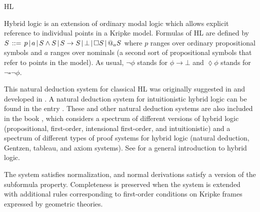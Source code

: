 \begin{entry}{HL}
\begin{clarifications}
Hybrid logic is an extension of ordinary modal logic which allows explicit reference to individual points in a Kripke model. Formulas of HL are defined by 
$S \hspace{.5mm} ::= \hspace{.5mm} p \hspace{.5mm} | \hspace{.5mm} a
\hspace{.5mm} | \hspace{.5mm} S \wedge S \hspace{.5mm} | \hspace{.5mm}
S \rightarrow S \hspace{.5mm} | \hspace{.5mm} \bot \hspace{.5mm} |
\hspace{.5mm} \square S \hspace{.5mm} | \hspace{.5mm} @_{a} S$
where $p$ ranges over ordinary propositional symbols and $a$ ranges
over nominals (a second sort of propositional symbols that refer to points in the model). As usual, $\neg \phi$ stands for $ \phi
\rightarrow \bot$ and $\lozenge \phi$ stands for $\neg \square \neg \phi$. 
\end{clarifications}

\begin{history}
This natural deduction system for classical HL was originally suggested in
\cite{Brauner01c} and developed in \cite{Brauner01b}. A natural deduction system for intuitionistic hybrid logic can be found in the entry . These and other natural deduction systems are also included in the book \cite{Brauner11a}, which considers a spectrum of different versions of hybrid logic
(propositional, first-order, intensional first-order, and intuitionistic)
and a spectrum of different types of proof systems for
hybrid logic (natural deduction, Gentzen, tableau, and axiom systems). See \cite{AC06} for a general introduction to hybrid logic.
\end{history}

\begin{technicalities}
The system satisfies normalization, and normal derivations satisfy a version of the subformula property. Completeness is preserved when the system is extended with additional rules corresponding to first-order conditions on Kripke frames expressed by geometric theories.
\end{technicalities}

\end{entry}
